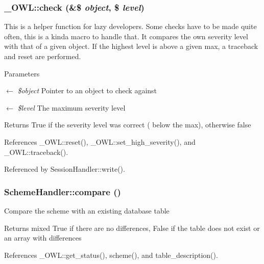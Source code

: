 \subsubsection[{check}]{\setlength{\rightskip}{0pt plus 5cm}\_\-OWL::check (\&\$ {\em object}, \/  \$ {\em level})}\label{class__OWL_ad6f4f6946f40199dd0333cf219fa500e}
This is a helper function for lazy developers. Some checks have to be made quite often, this is a kinda macro to handle that. It compares the own severity level with that of a given object. If the highest level is above a given max, a traceback and reset are performed.


\begin{DoxyParams}{Parameters}
\item[\mbox{$\leftarrow$} {\em \$object}]Pointer to an object to check against \item[\mbox{$\leftarrow$} {\em \$level}]The maximum severity level \end{DoxyParams}
\begin{DoxyReturn}{Returns}
True if the severity level was correct ( below the max), otherwise false 
\end{DoxyReturn}


References \_\-OWL::reset(), \_\-OWL::set\_\-high\_\-severity(), and \_\-OWL::traceback().



Referenced by SessionHandler::write().

\subsubsection[{compare}]{\setlength{\rightskip}{0pt plus 5cm}SchemeHandler::compare ()}\label{classSchemeHandler_ae2a981feae465ef5e46782b4a18da1ad}
Compare the scheme with an existing database table

\begin{DoxyReturn}{Returns}
mixed True if there are no differences, False if the table does not exist or an array with differences 
\end{DoxyReturn}


References \_\-OWL::get\_\-status(), scheme(), and table\_\-description().



